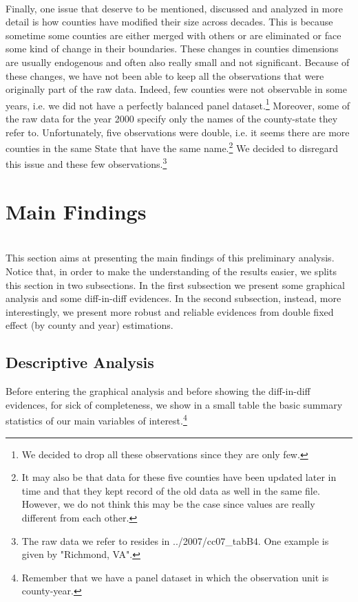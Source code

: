 \documentclass[a4paper,12pt]{article}
\begin{document}
\\Finally, one issue that deserve to be mentioned, discussed and analyzed in more detail is how counties have modified their size across decades. This is because sometime some counties are either merged with others or are eliminated or face some kind of change in their boundaries. These changes in counties dimensions are usually endogenous and often also really small and not significant. Because of these changes, we have not been able to keep all the observations that were originally part of the raw data. Indeed, few counties were not observable in some years, i.e. we did not have a perfectly balanced panel dataset.\footnote{We decided to drop all these observations since they are only few.} Moreover, some of the raw data for the year 2000 specify only the names of the county-state they refer to. Unfortunately, five observations were double, i.e. it seems there are more counties in the same State that have the same name.\footnote{It may also be that data for these five counties have been updated later in time and that they kept record of the old data as well in the same file. However, we do not think this may be the case since values are really different from each other.} We decided to disregard this issue and these few observations.\footnote{The raw data we refer to resides in ../2007/cc07\_tabB4. One example is given by "Richmond, VA".}

\section{Main Findings}

\\This section aims at presenting the main findings of this preliminary analysis. Notice that, in order to make the understanding of the results easier, we splits this section in two subsections. In the first subsection we present some graphical analysis and some diff-in-diff evidences. In the second subsection, instead, more interestingly, we present more robust and reliable evidences from double fixed effect (by county and year) estimations.

\subsection{Descriptive Analysis}
Before entering the graphical analysis and before showing the diff-in-diff evidences, for sick of completeness, we show in a small table the basic summary statistics of our main variables of interest.\footnote{Remember that we have a panel dataset in which the observation unit is county-year.}
\end{document}

